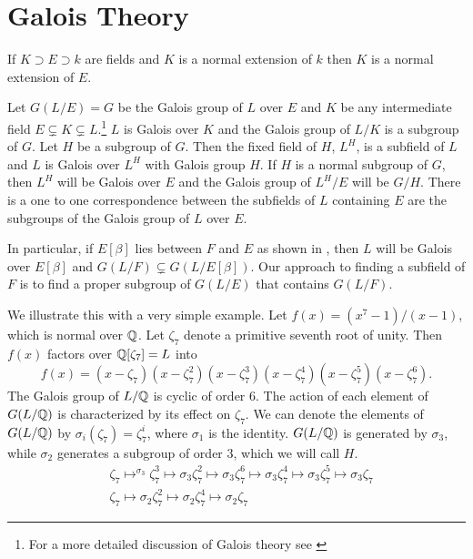 \chapter{Galois Theory}
\label{Galois:Chap}

\begin{proposition}
If $K \supset E \supset k$ are fields and $K$ is a normal extension of $k$
then $K$ is a normal extension of $E$.
\end{proposition}


Let $G(L/E) = G$ be the Galois group of $L$ over $E$ and $K$ be any
intermediate field $E \varsubsetneq K \varsubsetneq L$.\footnote{For a more
detailed discussion of Galois theory see \cite{Lang:Algebra}} $L$ is Galois
over $K$ and the Galois group of $L/K$ is a subgroup of $G$.  Let $H$ be a
subgroup of $G$.  Then the fixed field of $H$, $L^H$, is a subfield of $L$
and $L$ is Galois over $L^H$ with Galois group $H$.  If $H$ is a normal
subgroup of $G$, then $L^H$ will be Galois over $E$ and the Galois group of
$L^H/E$ will be $G/H$.  There is a one to one correspondence between the
subfields of $L$ containing $E$ are the subgroups of the Galois group of
$L$ over $E$.

In particular, if $E[\beta]$ lies between $F$ and $E$ as shown in
, then $L$ will be Galois over
$E[\beta]$ and $G(L/F) \varsubsetneq G(L/E[\beta])$.  Our approach to
finding a subfield of $F$ is to find a proper subgroup of $G(L/E)$ that
contains $G(L/F)$.

We illustrate this with a very simple example.  Let $f(x)= (x^7-1)/(x-1)$,
which is normal over $\mathbb{Q}$.  Let $\zeta_7$ denote a primitive seventh root
of unity.  Then $f(x)$ factors over $\mathbb{Q}[\zeta_7]=L$ into
\[
f(x) = (x - \zeta_7) (x - \zeta_7^2) (x - \zeta_7^3) (x - \zeta_7^4) (x -
\zeta_7^5) (x - \zeta_7^6).
\]
The Galois group of $L/\mathbb{Q}$ is cyclic of order $6$.  The action of each
element of $G(L/\mathbb{Q})$ is characterized by its effect on $\zeta_7$.  We can
denote the elements of $G(L/\mathbb{Q})$ by $\sigma_i(\zeta_7) = \zeta_7^i$, where
$\sigma_1$ is the identity.  $G(L/\mathbb{Q})$ is generated by $\sigma_3$, while
$\sigma_2$ generates a subgroup of order $3$, which we will call $H$.
\[
\begin{aligned}
& \zeta_7 \mapsto^{\sigma_3} \zeta_7^3 \mapsto{\sigma_3} \zeta_7^2
\mapsto{\sigma_3} \zeta_7^6 \mapsto{\sigma_3} \zeta_7^4
\mapsto{\sigma_3} \zeta_7^5 \mapsto{\sigma_3} \zeta_7 \\ & \zeta_7
\mapsto{\sigma_2} \zeta_7^2 \mapsto{\sigma_2} \zeta_7^4
\mapsto{\sigma_2} \zeta_7
\end{aligned}
\]

